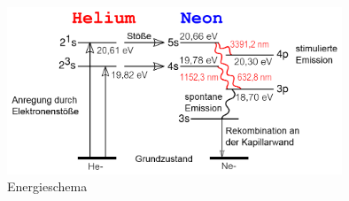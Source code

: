 \begin{refsection}
\begin{figure}
\centering
\includegraphics[width = 10cm]{laser/bilder/Energieschema.png}
\caption{Energieschema \cite{He-Ne-Laser-Energieschema}}
\label{Energieschema}
\end{figure}

\printbibliography[heading=subbibliography]

\end{refsection}

